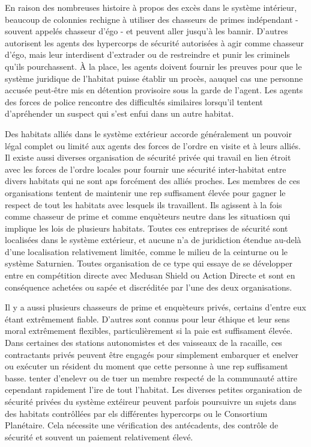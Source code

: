                En raison des nombreuses histoire à propos des excès dans le système intérieur, beaucoup de colonnies rechigne à utiliser des chasseurs de primes indépendant - souvent appelés chasseur d'égo - et peuvent aller jusqu'à les bannir. D'autres autorisent les agents des hypercorps de sécurité autorisées à agir comme chasseur d'égo, mais leur interdisent d'extrader ou de restreindre et punir les criminels qu'ils pourchassent. À la place, les agents doivent fournir les preuves pour que le système juridique de l'habitat puisse établir un procès, aauquel cas une personne accusée peut-être mis en détention provisoire sous la garde de l'agent. Les agents des forces de police rencontre des difficultés similaires lorsqu'il tentent d'apréhender un suspect qui s'est enfui dans un autre habitat. 

               Des habitats alliés dans le système extérieur accorde généralement un pouvoir légal complet ou limité aux agents des forces de l'ordre en visite et à leurs alliés. Il existe aussi diverses organisation de sécurité privée qui travail en lien étroit avec les forces de l'ordre locales pour fournir une sécurité inter-habitat entre divers habitats qui ne sont aps forcément des alliés proches. Les membres de ces organisations tentent de maintenir une rep suffisament élevée pour gagner le respect de tout les habitats avec lesquels ils travaillent. Ils agissent à la fois comme chasseur de prime et comme enquèteurs neutre dans les situatiosn qui implique les lois de plusieurs habitats. Toutes ces entreprises de sécurité sont localisées dans le système extérieur, et aucune n'a de juridiction étendue au-delà d'une localisation relativement limitée, comme le milieu de la ceinturne ou le système Saturnien. Toutes organisation de ce type qui essaye de se développer entre en compétition directe avec Medusan Shield ou Action Directe et sont en conséquence achetées ou sapée et discréditée par l'une des deux organisations. 

               Il y a aussi plusieurs chasseurs de prime et enquèteurs privés, certains d'entre eux étant extrêmement fiable. D'autres sont connus pour leur éthique et leur sens moral extrêmement flexibles, particulièrement si la paie est suffisament élevée. Dans certaines des stations autonomistes et des vaisseaux de la racaille, ces contractants privés peuvent être engagés pour simplement embarquer et enelver ou exécuter un résident du moment que cette personne à une rep suffisament basse. tenter d'enelevr ou de tuer un membre respecté de la communauté attire cependant rapidement l'ire de tout l'habitat. Les diverses petites organisation de sécurité privées du système extéireur peuvent parfois poursuivre un sujets dans des habitats contrôllées par els différentes hypercorps ou le Consortium Planétaire. Cela nécessite une vérification des antécadents, des contrôle de sécurité et souvent un paiement relativement élevé. 

